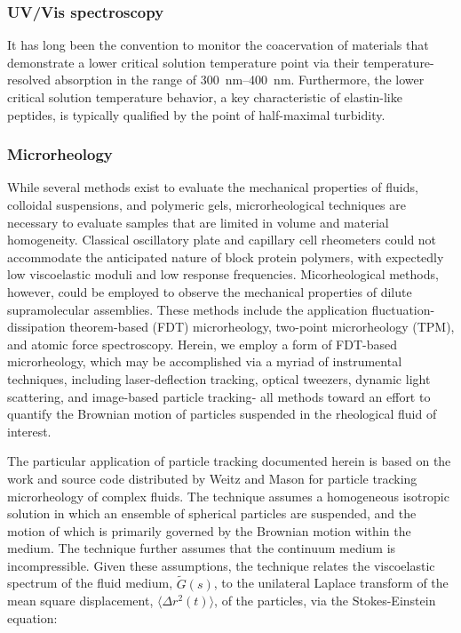 \begin{refsection}
\subsubsection{UV/Vis spectroscopy}
It has long been the convention to monitor the coacervation of materials that
demonstrate a lower critical
solution temperature point via their temperature-resolved absorption in the
range of \SIrange{300}{400}{\nm}. Furthermore, the lower critical solution
temperature behavior, a key characteristic of elastin-like peptides,
is typically qualified by the point of half-maximal turbidity.\cite{Urry1993}

\subsubsection{Microrheology}
While several methods exist to evaluate the mechanical properties of fluids,
colloidal suspensions, and polymeric gels, microrheological techniques are
necessary to evaluate samples that are limited in volume and material
homogeneity. Classical oscillatory plate and capillary cell rheometers could not
accommodate the anticipated nature of block protein polymers, with expectedly
low viscoelastic moduli and low response frequencies. Micorheological methods,
however, could be employed to observe the mechanical properties of dilute
supramolecular assemblies. These methods include the application
fluctuation-dissipation theorem-based (FDT)
microrheology,\cite{Gittes1997,Mason1997,Mason1997a} two-point microrheology
(TPM),\cite{Crocker2000,Levine2000,Qiu2004,Levine2001} and atomic force
spectroscopy.\cite{Salman2002,Caspi2002} Herein, we employ a form of FDT-based
microrheology, which may be accomplished via a myriad of instrumental
techniques, including laser-deflection tracking,\cite{Gittes1997,Mason1997}
optical tweezers,\cite{Starrs2003,Addas2004} dynamic light
scattering,\cite{Dasgupta2002,Popescu2002} and image-based particle
tracking\cite{Valentine2004,Crocker2000,Chen2003}- all methods toward an effort
to quantify the Brownian motion of particles suspended in the rheological fluid
of interest.

The particular application of particle tracking documented herein is based on
the work and source code distributed by Weitz and Mason for particle tracking
microrheology of complex fluids.\cite{Mason1997} The technique assumes a
homogeneous isotropic solution in which an ensemble of spherical particles are
suspended, and the motion of which is primarily governed by the Brownian motion
within the medium.  The technique further assumes that the continuum medium is
incompressible. Given these assumptions, the technique relates the viscoelastic
spectrum of the fluid medium, ${\tilde{G}(s)}$, to the unilateral Laplace
transform of the mean square displacement, ${\langle \Delta r^2(t) \rangle}$, of
the particles, via the Stokes-Einstein equation:


\end{refsection}
